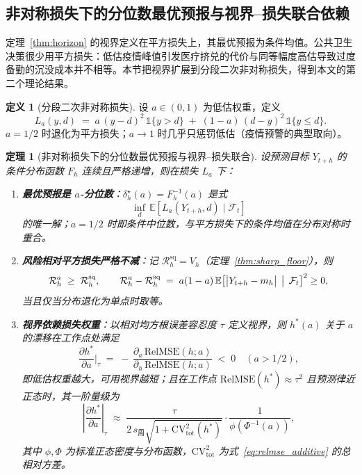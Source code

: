 \documentclass[10pt,UTF8,a4paper,zihao=-4]{ctexart}
\theoremstyle{plain}
\newtheorem{theorem}{定理}
\theoremstyle{definition}
\newtheorem{definition}{定义}
\theoremstyle{remark}
\begin{document}
\subsection{非对称损失下的分位数最优预报与视界--损失联合依赖}

定理~\ref{thm:horizon} 的视界定义在平方损失上，其最优预报为条件均值。公共卫生决策很少用平方损失：低估疫情峰值引发医疗挤兑的代价与同等幅度高估导致过度备勤的沉没成本并不相等。本节把视界扩展到分段二次非对称损失，得到本文的第二个理论结果。

\begin{definition}[分段二次非对称损失]\label{def:asym_loss}
设 $a \in (0,1)$ 为低估权重，定义
\begin{equation}
L_a(y, d) \;=\; a\,(y-d)^2\,\mathbb{1}\{y > d\} \;+\; (1-a)\,(d-y)^2\,\mathbb{1}\{y \le d\}.
\end{equation}
$a = 1/2$ 时退化为平方损失；$a \to 1$ 时几乎只惩罚低估（疫情预警的典型取向）。
\end{definition}

\begin{theorem}[非对称损失下的分位数最优预报与视界--损失联合]\label{thm:asym}
设预测目标 $Y_{t+h}$ 的条件分布函数 $F_h$ 连续且严格递增，则在损失 $L_a$ 下：
\begin{enumerate}[label=(\roman*)]
\item \textbf{最优预报是 $a$-分位数}：$\delta_h^\star(a) = F_h^{-1}(a)$ 是式
\begin{equation}
\inf_{d}\,\mathbb{E}\!\left[L_a(Y_{t+h}, d)\mid \mathcal{F}_t\right]
\end{equation}
的唯一解；$a=1/2$ 时即条件中位数，与平方损失下的条件均值在分布对称时重合。
\item \textbf{风险相对平方损失严格不减}：记 $\mathcal{R}^{\text{sq}}_h = V_h$（定理~\ref{thm:sharp_floor}），则
\begin{equation}
\mathcal{R}^{a}_h \;\ge\; \mathcal{R}^{\text{sq}}_h,\qquad
\mathcal{R}^{a}_h - \mathcal{R}^{\text{sq}}_h \;=\; a(1-a)\,\mathbb{E}\!\left[\bigl|Y_{t+h} - m_h\bigr|\,\bigm|\, \mathcal{F}_t\right]^2 \ge 0,
\end{equation}
当且仅当分布退化为单点时取等。
\item \textbf{视界依赖损失权重}：以相对均方根误差容忍度 $\tau$ 定义视界，则 $h^*(a)$ 关于 $a$ 的漂移在工作点处满足
\begin{equation}
\frac{\partial h^*}{\partial a}\Bigg|_{\tau} \;=\; -\,\frac{\partial_{\!a}\,\text{RelMSE}(h;a)}{\partial_{\!h}\,\text{RelMSE}(h;a)} \;<\;0 \quad (a > 1/2),
\end{equation}
即低估权重越大，可用视界越短；且在工作点 $\text{RelMSE}(h^*) \approx \tau^2$ 且预测律近正态时，其一阶量级为
\begin{equation}
\left|\frac{\partial h^*}{\partial a}\right|_{\tau} \;\approx\; \frac{\tau}{2\,s_{\text{周}}\sqrt{1+\text{CV}^2_{\text{tot}}(h^*)}}\cdot\frac{1}{\phi\!\left(\Phi^{-1}(a)\right)},
\end{equation}
其中 $\phi,\Phi$ 为标准正态密度与分布函数，$\text{CV}^2_{\text{tot}}$ 为式~\eqref{eq:relmse_additive} 的总相对方差。
\end{enumerate}
\end{theorem}
\end{document}
